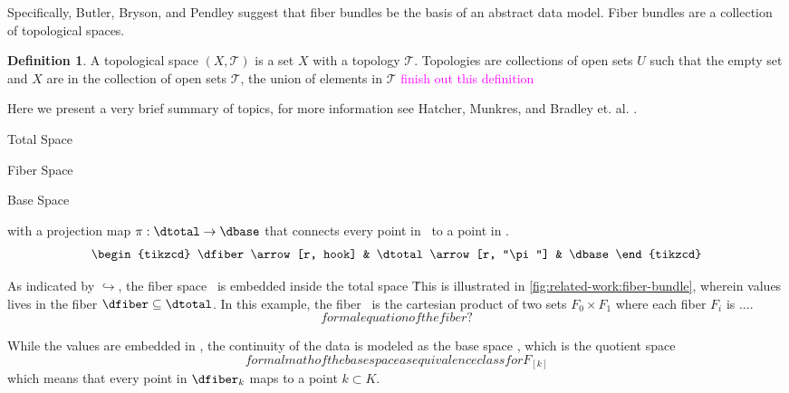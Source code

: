 \documentclass[10pt,journal,compsoc]{IEEEtran}
\newcommand{\note}[1]{\textcolor{magenta}{#1}}
\theoremstyle{definition}
\newtheorem{definition}{Definition}[section]
\theoremstyle{remark}
\begin{document}
Specifically, Butler, Bryson, and Pendley suggest that fiber bundles be the basis of an abstract data model. Fiber bundles are a collection of topological spaces. 
\begin{definition}
A topological space $(X, \mathscr{T})$ is a set $X$ with a topology $\mathscr{T}$. Topologies are collections of open sets $U$ such that the empty set and $X$ are in the collection of open sets $\mathscr{T}$, the union of elements in $\mathscr{T}$ \note{finish out this definition}
\end{definition}

Here we present a very brief summary of topics, for more information see Hatcher\cite{hatcherAlgebraicTopology2002}, Munkres\cite{munkresElementsAlgebraicTopology1984}, and Bradley et. al. \cite{bradleyTopologyCategoricalApproach2020}. 


\begin{LaTeXdescription}
  \item[\textcolor{total}{Total Space} \dtotal]
  \item[\textcolor{fiber}{Fiber Space} \dfiber]
  \item[\textcolor{base}{Base Space} \dbase]  
\end{LaTeXdescription}

with a projection map $\pi:\dtotal\rightarrow\dbase$ that connects every point in \dtotal\ to a point in \dbase. 
\begin{equation}
  \label{eq:fiber_bundle}
  \begin{tikzcd}
      \dfiber \arrow[r, hook] & \dtotal \arrow[r, "\pi"] & \dbase
  \end{tikzcd}
\end{equation}

As indicated by $\hookrightarrow$, the fiber space \dfiber\ is embedded inside the total space \dtotal\. This is illustrated in \autoref{fig:related-work:fiber-bundle}, wherein values lives in the fiber $\dfiber\subseteq\dtotal$. In this example, the fiber \dfiber\ is the cartesian product of two sets $F_{0}\times F_{1}$ where each fiber $F_{i}$ is ....
\begin{equation}
  formal equation of the fiber?
  \label{eq:related-work:fiber}
\end{equation}

While the values are embedded in \dfiber, the continuity of the data is modeled as the base space \dbase, which is the quotient space \cite{QuotientSpaceTopology2020}
\begin{equation}
formal math of the base space as equivalence class for F_[k]
\end{equation}
which means that every point in $\dfiber_{k}$ maps to a point $k \subset K$. 
\end{document}
